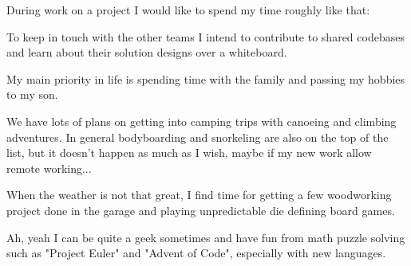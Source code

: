 \documentclass[10pt,a4paper,ragged2e,withhyper]{altacv}
\begin{document}
\vspace{1px}

During work on a project I would like to spend my time roughly like that:


\vspace{1px}

To keep in touch with the other teams I intend to contribute to shared codebases and
learn about their solution designs over a whiteboard.


My main priority in life is spending time with the family and passing my hobbies to my son.

We have lots of plans on getting into camping trips with canoeing and climbing adventures.
In general bodyboarding and snorkeling are also on the top of the list, but it doesn't
happen as much as I wish, maybe if my new work allow remote working...

When the weather is not that great, I find time for getting a few woodworking project done
in the garage and playing unpredictable die defining board games.

Ah, yeah I can be quite a geek sometimes and have fun from math puzzle solving such as
"Project Euler" and "Advent of Code", especially with new languages.

\end{document}
